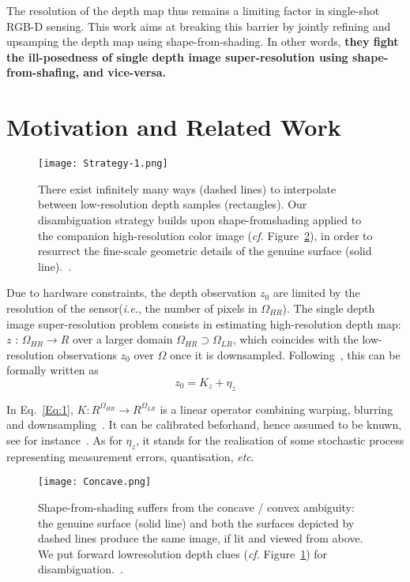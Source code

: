 \documentclass[10pt,twocolumn,letterpaper]{article}
\begin{document}
The resolution of the depth map thus remains a limiting factor in single-shot RGB-D sensing. This work aims at breaking this barrier by jointly refining and upsamping the depth map using shape-from-shading. In other words, \textbf{they fight the ill-posedness of single depth image super-resolution using shape-from-shafing, and vice-versa.}\par


\section{Motivation and Related Work}

\begin{figure}[!htp]
\begin{center}
   \texttt{[image: Strategy-1.png]}
\end{center}
   \caption{There exist infinitely many ways (dashed lines) to interpolate between low-resolution depth samples (rectangles). Our disambiguation strategy builds upon shape-fromshading applied to the companion high-resolution color image (\emph{cf.} Figure~\ref{fig:Concave}), in order to resurrect the fine-scale geometric details of the genuine surface (solid line).~\cite{Haefner_2018_CVPR}.}
\label{fig:Strategy}
\end{figure}

Due to hardware constraints, the depth observation $z_0$ are limited by the resolution of the sensor(\emph{i.e.}, the number of pixels in $\Omega_{HR}$). The single depth image super-resolution problem consists in estimating high-resolution depth map: $z$ : $\Omega_{HR} \rightarrow R$ over a larger domain $\Omega_{HR} \supset \Omega_{LR}$, which coincides with the low-resolution observations $z_0$ over $\Omega$ once it is downsampled. Following~\cite{Elad1997Restoration}, this can be formally written as
\begin{equation}
z_0 = K_z + \eta_z
\label{Eq:1}
\end{equation}\par
In Eq.~\ref{Eq:1}, $K : R^{\Omega_{HR}}\rightarrow R^{\Omega_{LR}}$ is a linear operator combining warping, blurring and downsampling~\cite{Strekalovskiy2014Real}. It can be calibrated beforhand, hence assumed to be knuwn, see for instance~\cite{Park2011High}. As for $\eta_z$, it stands for the realisation of some stochastic process representing measurement errors, quantisation, \emph{etc}.

\begin{figure}[!htp]
\begin{center}
   \texttt{[image: Concave.png]}
\end{center}
   \caption{Shape-from-shading suffers from the concave /
convex ambiguity: the genuine surface (solid line) and both
the surfaces depicted by dashed lines produce the same image,
if lit and viewed from above. We put forward lowresolution
depth clues (\emph{cf.} Figure~\ref{fig:Strategy}) for disambiguation.~\cite{Haefner_2018_CVPR}.}
\label{fig:Concave}
\end{figure}
\end{document}
